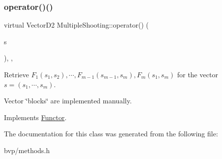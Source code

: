 \subsubsection{\texorpdfstring{operator()()}{operator()()}}
{\footnotesize\ttfamily virtual Vector\+D2 Multiple\+Shooting\+::operator() (\begin{DoxyParamCaption}\item[{const Vector\+D2 \&}]{s }\end{DoxyParamCaption})\hspace{0.3cm}{\ttfamily [inline]}, {\ttfamily [override]}, {\ttfamily [virtual]}}



Retrieve $F_1(s_1, s_2),\cdots, F_{m-1}(s_{m-1},s_m), F_m(s_1,s_m)$ for the vector $s = (s_1,\cdots,s_m)$. 

Vector \char`\"{}blocks\char`\"{} are implemented manually. 

Implements \hyperlink{classFunctor}{Functor}.



The documentation for this class was generated from the following file\+:\begin{DoxyCompactItemize}
\item 
bvp/methods.\+h\end{DoxyCompactItemize}
